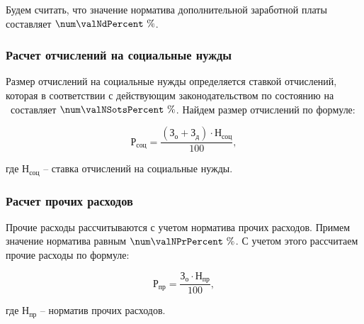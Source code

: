 Будем считать, что значение норматива дополнительной заработной платы составляет
$ \num\valNdPercent \ \% $.


\subsubsection{Расчет отчислений на социальные нужды}


Размер отчислений на социальные нужды определяется ставкой отчислений, которая
в соответствии с действующим законодательством по состоянию на \econCalcDate\
составляет $ \num\valNSotsPercent \ \% $. Найдем размер отчислений по формуле:

\begin{equation}
  \label{eq:econ:RSots}
  \text{Р}_\text{соц} = \frac{(\text{З}_\text{о} + \text{З}_\text{д}) \cdot \text{Н}_\text{соц}}
    {100},
\end{equation}
\begin{explanationx}
  \item[где] $ \text{Н}_\text{соц} $ -- ставка отчислений на социальные нужды.
\end{explanationx}


\subsubsection{Расчет прочих расходов}


Прочие расходы рассчитываются с учетом норматива прочих расходов. Примем значение
норматива равным $ \num\valNPrPercent \ \% $. С учетом этого рассчитаем прочие расходы
по формуле:

\begin{equation}
  \label{eq:econ:RPr}
  \text{Р}_\text{пр} = \frac{\text{З}_\text{о} \cdot \text{Н}_\text{пр}}
    {100},
\end{equation}
\begin{explanationx}
  \item[где] $ \text{Н}_\text{пр} $ -- норматив прочих расходов.
\end{explanationx}


